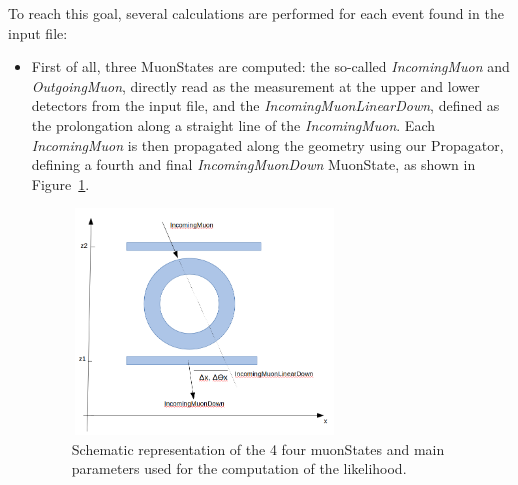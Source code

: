 \documentclass[a4paper, 11pt]{report}
\begin{document}
To reach this goal, several calculations are performed for each event found in the input file: 
\begin{itemize}
\item First of all, three MuonStates are computed: the so-called \textit{IncomingMuon} and \textit{OutgoingMuon}, directly read as the measurement at the upper and lower detectors from the input file, and the \textit{IncomingMuonLinearDown}, defined as the prolongation along a straight line of the \textit{IncomingMuon}. Each \textit{IncomingMuon} is then propagated along the geometry using our Propagator, defining a fourth and final \textit{IncomingMuonDown} MuonState, as shown in Figure~\ref{fig:parameters}.

\begin{figure}[htbp]
\centering
\begin{minipage}[b]{.49\textwidth}
\includegraphics[width=7cm, height=6cm]{figs/parameters.png}
\end{minipage}\hfill
\caption{Schematic representation of the 4 four muonStates and main parameters used for the computation of the likelihood.}
\label{fig:parameters}
\end{figure}


\end{itemize}
\end{document}
